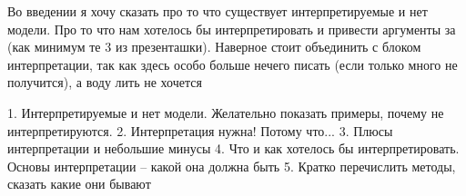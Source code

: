 Во введении я хочу сказать про то что существует интерпретируемые и нет модели. Про то что нам хотелось бы интерпретировать и привести аргументы за (как минимум те 3 из презенташки). Наверное стоит объединить с блоком интерпретации, так как здесь особо больше нечего писать (если только много не получится), а воду лить не хочется

1. Интерпретируемые и нет модели. Желательно показать примеры, почему не интерпретируются.
2. Интерпретация нужна! Потому что...
3. Плюсы интерпретации и небольшие минусы
4. Что и как хотелось бы интерпретировать. Основы интерпретации -- какой она должна быть
5. Кратко перечислить методы, сказать какие они бывают